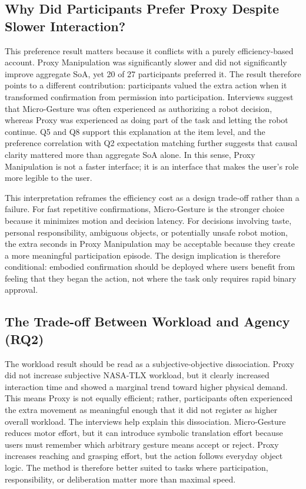\documentclass[sigconf,review,anonymous]{acmart}
\begin{document}
\subsection{Why Did Participants Prefer Proxy Despite Slower Interaction?}
This preference result matters because it conflicts with a purely efficiency-based account. Proxy Manipulation was significantly slower and did not significantly improve aggregate SoA, yet 20 of 27 participants preferred it. The result therefore points to a different contribution: participants valued the extra action when it transformed confirmation from permission into participation. Interviews suggest that Micro-Gesture was often experienced as authorizing a robot decision, whereas Proxy was experienced as doing part of the task and letting the robot continue. Q5 and Q8 support this explanation at the item level, and the preference correlation with Q2 expectation matching further suggests that causal clarity mattered more than aggregate SoA alone. In this sense, Proxy Manipulation is not a faster interface; it is an interface that makes the user's role more legible to the user.

This interpretation reframes the efficiency cost as a design trade-off rather than a failure. For fast repetitive confirmations, Micro-Gesture is the stronger choice because it minimizes motion and decision latency. For decisions involving taste, personal responsibility, ambiguous objects, or potentially unsafe robot motion, the extra seconds in Proxy Manipulation may be acceptable because they create a more meaningful participation episode. The design implication is therefore conditional: embodied confirmation should be deployed where users benefit from feeling that they began the action, not where the task only requires rapid binary approval.

\subsection{The Trade-off Between Workload and Agency (RQ2)}
The workload result should be read as a subjective-objective dissociation. Proxy did not increase subjective NASA-TLX workload, but it clearly increased interaction time and showed a marginal trend toward higher physical demand. This means Proxy is not equally efficient; rather, participants often experienced the extra movement as meaningful enough that it did not register as higher overall workload. The interviews help explain this dissociation. Micro-Gesture reduces motor effort, but it can introduce symbolic translation effort because users must remember which arbitrary gesture means accept or reject. Proxy increases reaching and grasping effort, but the action follows everyday object logic. The method is therefore better suited to tasks where participation, responsibility, or deliberation matter more than maximal speed.
\end{document}
